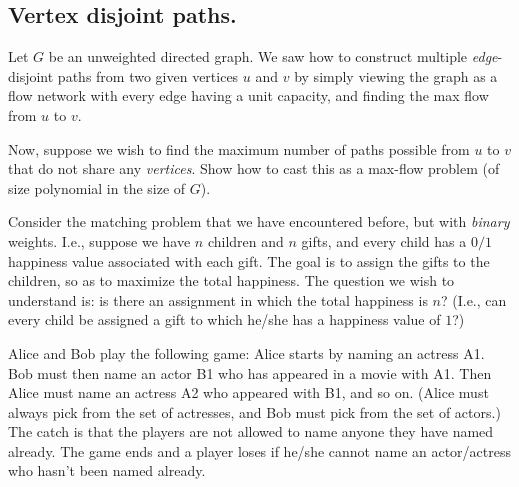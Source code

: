 \documentclass[addpoints]{exam}
\begin{document}
\begin{questions}
\begin{parts}
\part[5] {\bf Vertex disjoint paths.}  Let $G$ be an unweighted directed graph.  We saw how to construct multiple {\em edge}-disjoint paths from two given vertices $u$ and $v$ by simply viewing the graph as a flow network with every edge having a unit capacity, and finding the max flow from $u$ to $v$.

Now, suppose we wish to find the maximum number of paths possible from $u$ to $v$ that do not share any {\em vertices}.  Show how to cast this as a max-flow problem (of size polynomial in the size of $G$). 
\end{parts}

Consider the matching problem that we have encountered before, but with {\em binary} weights. I.e., suppose we have $n$ children and $n$ gifts, and every child has a $0/1$ happiness value associated with each gift. The goal is to assign the gifts to the children, so as to maximize the total happiness. The question we wish to understand is: is there an assignment in which the total happiness is $n$? (I.e., can every child be assigned a gift to which he/she has a happiness value of $1$?)


Alice and Bob play the following game: Alice starts by naming an actress A1. Bob must then name an actor B1 who has appeared in a movie with A1. Then Alice must name an actress A2 who appeared with B1, and so on. (Alice must always pick from the set of actresses, and Bob must pick from the set of actors.) The catch is that the players are not allowed to name anyone they have named already. The game ends and a player loses if he/she cannot name an actor/actress who hasn't been named already.


\end{questions}
\end{document}
